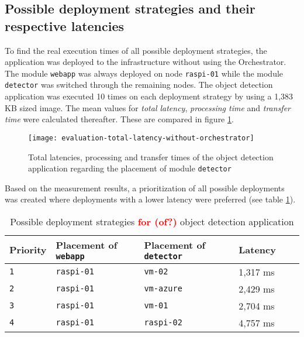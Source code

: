 \subsection{Possible deployment strategies and their respective latencies\label{sec:eval-possible-deployments}}
To find the real execution times of all possible deployment strategies, the application was deployed to the infrastructure without using the Orchestrator.
The module \texttt{webapp} was always deployed on node \texttt{raspi-01} while the module \texttt{detector} was switched through the remaining nodes.
The object detection application was executed 10 times on each deployment strategy by using a 1,383 KB sized image.
The mean values for \textit{total latency}, \textit{processing time} and \textit{transfer time} were calculated thereafter. These are compared in figure \ref{fig:evaluation-total-latency-without-orchestrator}.

\begin{figure}[h!]
    \centering
    \texttt{[image: evaluation-total-latency-without-orchestrator]}
    \caption{Total latencies, processing and transfer times of the object detection application regarding the placement of module \texttt{detector}}
    \label{fig:evaluation-total-latency-without-orchestrator}
\end{figure}

Based on the measurement results, a prioritization of all possible deployments was created where deployments with a lower latency were preferred (see table \ref{tab:deployment-strategies-prios}).
\begin{table}[h!tb]
    \centering
    \begin{tabular}{|l|l|l|l|l|l|}
    \hline
        \textbf{Priority} & \textbf{Placement of \texttt{webapp}} & \textbf{Placement of \texttt{detector}} & \textbf{Latency} \\
         \hline
         \texttt{1} & \texttt{raspi-01} & \texttt{vm-02} & 1,317 ms\\
         \hline
         \texttt{2} & \texttt{raspi-01} & \texttt{vm-azure} & 2,429 ms\\
         \hline
         \texttt{3} & \texttt{raspi-01} & \texttt{vm-01} & 2,704 ms\\
         \hline
         \texttt{4} & \texttt{raspi-01} & \texttt{raspi-02} & 4,757 ms\\
         \hline
    \end{tabular}
    \caption{Possible deployment strategies \textcolor{red}{\textbf{for (of?)}} object detection application}
    \label{tab:deployment-strategies-prios}
\end{table}

